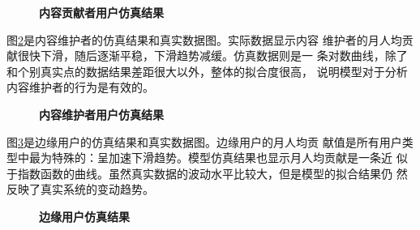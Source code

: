 \begin{figure}[!htb]
  \centering
  \caption{\small{\textbf{内容贡献者用户仿真结果}}}
  \label{fig:simu3}
\end{figure}

图\ref{fig:simu4}是内容维护者的仿真结果和真实数据图。实际数据显示内容
维护者的月人均贡献很快下滑，随后逐渐平稳，下滑趋势减缓。仿真数据则是一
条对数曲线，除了和个别真实点的数据结果差距很大以外，整体的拟合度很高，
说明模型对于分析内容维护者的行为是有效的。
\begin{figure}[!htb]
  \centering
  \caption{\small{\textbf{内容维护者用户仿真结果}}}
  \label{fig:simu4}
\end{figure}

图\ref{fig:simu5}是边缘用户的仿真结果和真实数据图。边缘用户的月人均贡
献值是所有用户类型中最为特殊的：呈加速下滑趋势。模型仿真结果也显示月人均贡献是一条近
似于指数函数的曲线。虽然真实数据的波动水平比较大，但是模型的拟合结果仍
然反映了真实系统的变动趋势。
\begin{figure}[!htb]
  \centering
  \caption{\small{\textbf{边缘用户仿真结果}}}
  \label{fig:simu5}
\end{figure}


